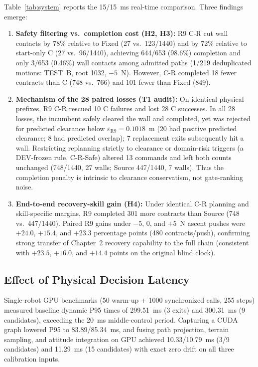 \documentclass[letterpaper,10pt,conference]{ieeeconf}
\begin{document}
Table~\ref{tab:system} reports the 15/15~ms real-time comparison. Three findings emerge:
\begin{enumerate}
\item \textbf{Safety filtering vs.\ completion cost (H2, H3):} R9 C-R cut wall contacts by 78\% relative to Fixed (27 vs.\ 123/1440) and by 72\% relative to start-only C (27 vs.\ 96/1440), achieving 644/653 (98.6\%) completion and only 3/653 (0.46\%) wall contacts among admitted paths (1/219 deduplicated motions: TEST~B, root 1032, $-5$~N). However, C-R completed 18 fewer contracts than C (748 vs.\ 766) and 101 fewer than Fixed (849).
\item \textbf{Mechanism of the 28 paired losses (T1 audit):} On identical physical prefixes, R9 C-R rescued 10 C failures and lost 28 C successes. In all 28 losses, the incumbent safely cleared the wall and completed, yet was rejected for predicted clearance below $\varepsilon_{\mathrm{R9}}=0.1018$~m (20 had positive predicted clearance; 8 had predicted overlap); 7 replacement exits subsequently hit a wall. Restricting replanning strictly to clearance or domain-risk triggers (a DEV-frozen rule, C-R-Safe) altered 13 commands and left both counts unchanged (748/1440, 27 walls; Source 447/1440, 7 walls). Thus the completion penalty is intrinsic to clearance conservatism, not gate-ranking noise.
\item \textbf{End-to-end recovery-skill gain (H4):} Under identical C-R planning and skill-specific margins, R9 completed 301 more contracts than Source (748 vs.\ 447/1440). Paired R9 gains under $-5$, $0$, and $+5$~N ascent pushes were $+24.0$, $+15.4$, and $+23.3$ percentage points (480 contracts/push), confirming strong transfer of Chapter~2 recovery capability to the full chain (consistent with $+23.5$, $+16.0$, and $+14.4$ points on the original blind clock).
\end{enumerate}

\subsection{Effect of Physical Decision Latency}
Single-robot GPU benchmarks (50 warm-up + 1000 synchronized calls, 255 steps) measured baseline dynamic P95 times of 299.51~ms (3 exits) and 300.31~ms (9 candidates), exceeding the 20~ms middle-control period. Capturing a CUDA graph lowered P95 to 83.89/85.34~ms, and fusing path projection, terrain sampling, and attitude integration on GPU achieved 10.33/10.79~ms (3/9 candidates) and 11.29~ms (15 candidates) with exact zero drift on all three calibration inputs.
\end{document}
